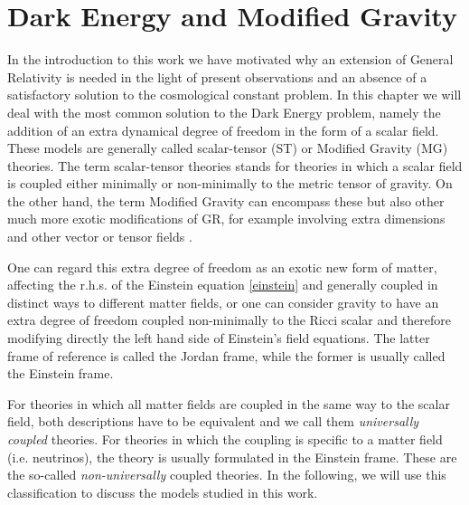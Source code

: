 \chapter{Dark Energy and Modified Gravity} %

\label{DE-MG} %




In the introduction to this work we have motivated why an extension of General Relativity
is needed in the light of present observations and an absence of a satisfactory
solution to the cosmological constant problem.
In this chapter we will deal with the most common solution to the Dark Energy problem,
namely the addition of an extra dynamical degree of freedom in the form of a scalar field.
These models are generally called scalar-tensor (ST) \cite{Luca, Skordis, de Felice, etc.} or Modified Gravity (MG)
\cite{Silvestri, Skordis, Vernizzi, etc.} theories. 
The term scalar-tensor theories stands for theories in which a scalar field is coupled either minimally or non-minimally
to the metric tensor of gravity. On the other hand, the term 
Modified Gravity can encompass these but also other much more exotic modifications of GR, 
for example involving extra dimensions and other 
vector or tensor fields \cite{cite, bigravity, LH vector theory, dgp}. 

One can regard this extra degree of freedom as an exotic new form of matter, affecting the 
r.h.s. of the Einstein equation \ref{einstein} and generally coupled in distinct ways to different matter fields, 
or one can consider gravity to have an extra degree of freedom coupled non-minimally to the 
Ricci scalar and therefore modifying 
directly the left hand side of Einstein's field equations. The latter frame of reference
is called the Jordan frame, while the former is usually called the Einstein frame.

For theories in which all matter fields are coupled in the same way to the scalar field, both descriptions
have to be equivalent and we call them \emph{universally coupled} theories. 
For theories in which the coupling is specific to a matter field (i.e. neutrinos), the theory 
is usually formulated in the Einstein frame. These are the so-called \emph{non-universally} coupled theories.
In the following, we will use this classification to discuss the models studied in this work.

